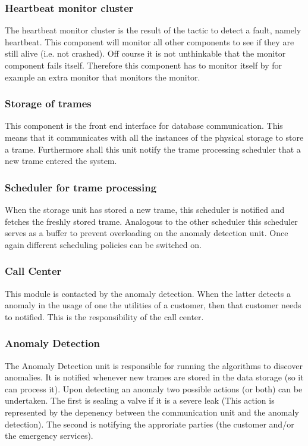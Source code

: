 \subsubsection{Heartbeat monitor cluster}

\npar The heartbeat monitor cluster is the result of the tactic to detect a
fault, namely heartbeat. This component will monitor all other components to see
if they are still alive (i.e. not crashed). Off course it is not unthinkable
that the monitor component fails itself. Therefore this component has to monitor
itself by for example an extra monitor that monitors the monitor.

\subsubsection{Storage of trames}

\npar This component is the front end interface for database communication. This
means that it communicates with all the instances of the physical storage to
store a trame. Furthermore shall this unit notify the trame processing scheduler
that a new trame entered the system. 

\subsubsection{Scheduler for trame processing}

\npar When the storage unit has stored a new trame, this scheduler is notified
and fetches the freshly stored trame. Analogous to the other scheduler this
scheduler serves as a buffer to prevent overloading on the anomaly detection
unit. Once again different scheduling policies can be switched on.

\subsubsection{Call Center}

\npar This module is contacted by the anomaly detection. When the latter detects
a anomaly in the usage of one the utilities of a customer, then that customer
needs to notified. This is the responsibility of the call center.

\subsubsection{Anomaly Detection}

\npar The Anomaly Detection unit is responsible for running the algorithms to
discover anomalies. It is notified whenever new trames are stored in
the data storage (so it can process it). Upon detecting an anomaly two possible
actions (or both) can be undertaken. The first is sealing a valve if it is a
severe leak (This action is represented by the depenency between the
communication unit and the anomaly detection). The second is notifying the
approriate parties (the customer and/or the emergency services).

